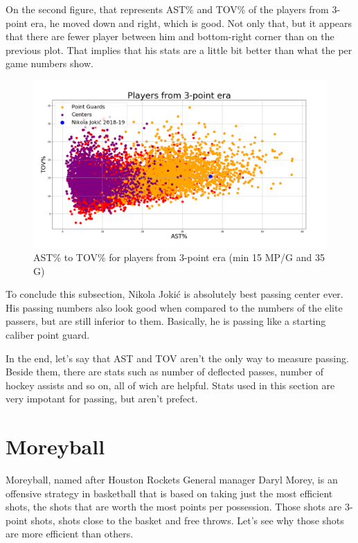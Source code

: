 \documentclass[a4paper]{article}
\begin{document}
On the second figure, that represents AST\% and TOV\% of the players from 3-point era, he moved down and right, which is good. Not only that, but it appears that there are fewer player between him and bottom-right corner than on the previous plot. That implies that his stats are a little bit better than what the per game numbers show.

\begin{figure}[h!]
\begin{center}
\includegraphics[scale=0.30]{ast_tov_pct_3point_era.png}
\end{center}
\caption{AST\% to TOV\% for players from 3-point era (min 15 MP/G and 35 G)}
\label{plt:ast_tov_pct_3p}
\end{figure}

To conclude this subsection, Nikola Joki\' c is absolutely best passing center ever. His passing numbers also look good when compared to the numbers of the elite passers, but are still inferior to them. Basically, he is passing like a starting caliber point guard.

In the end, let's say that AST and TOV aren't the only way to measure passing. Beside them, there are stats such as number of deflected passes, number of hockey assists and so on, all of wich are helpful. Stats used in this section are very impotant for passing, but aren't prefect.

\pagebreak

\section{Moreyball}
\label{sec:moreyball}

Moreyball, named after Houston Rockets General manager Daryl Morey, is an offensive strategy in basketball that is based on taking just the most efficient shots, the shots that are worth the most points per possession. Those shots are 3-point shots, shots close to the basket and free throws. Let's see why those shots are more efficient than others.
\end{document}
